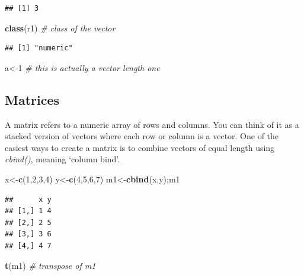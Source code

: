 \documentclass[12pt,]{krantz}
\newenvironment{Shaded}{\begin{snugshade}}{\end{snugshade}}
\newcommand{\CommentTok}[1]{\textcolor[rgb]{0.56,0.35,0.01}{\textit{#1}}}
\newcommand{\DecValTok}[1]{\textcolor[rgb]{0.00,0.00,0.81}{#1}}
\newcommand{\KeywordTok}[1]{\textcolor[rgb]{0.13,0.29,0.53}{\textbf{#1}}}
\newcommand{\NormalTok}[1]{#1}
\begin{document}
\begin{verbatim}
## [1] 3
\end{verbatim}

\begin{Shaded}
\begin{Highlighting}[]
\KeywordTok{class}\NormalTok{(r1)            }\CommentTok{# class of the vector}
\end{Highlighting}
\end{Shaded}

\begin{verbatim}
## [1] "numeric"
\end{verbatim}

\begin{Shaded}
\begin{Highlighting}[]
\NormalTok{a<-}\DecValTok{1}                \CommentTok{# this is actually a vector length one}
\end{Highlighting}
\end{Shaded}

\hypertarget{matrices}{%
\subsection{Matrices}\label{matrices}}

A matrix refers to a numeric array of rows and columns. You can think of it as a stacked version of vectors where each row or column is a vector. One of the easiest ways to create a matrix is to combine vectors of equal length using \emph{cbind()}, meaning `column bind'.

\begin{Shaded}
\begin{Highlighting}[]
\NormalTok{x<-}\KeywordTok{c}\NormalTok{(}\DecValTok{1}\NormalTok{,}\DecValTok{2}\NormalTok{,}\DecValTok{3}\NormalTok{,}\DecValTok{4}\NormalTok{)}
\NormalTok{y<-}\KeywordTok{c}\NormalTok{(}\DecValTok{4}\NormalTok{,}\DecValTok{5}\NormalTok{,}\DecValTok{6}\NormalTok{,}\DecValTok{7}\NormalTok{)}
\NormalTok{m1<-}\KeywordTok{cbind}\NormalTok{(x,y);m1}
\end{Highlighting}
\end{Shaded}

\begin{verbatim}
##      x y
## [1,] 1 4
## [2,] 2 5
## [3,] 3 6
## [4,] 4 7
\end{verbatim}

\begin{Shaded}
\begin{Highlighting}[]
\KeywordTok{t}\NormalTok{(m1)                }\CommentTok{# transpose of m1}
\end{Highlighting}
\end{Shaded}
\end{document}
